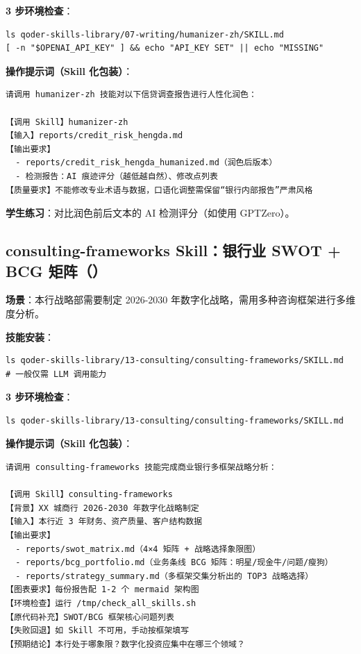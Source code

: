 \textbf{3 步环境检查}：
\begin{lstlisting}[style=shell]
ls qoder-skills-library/07-writing/humanizer-zh/SKILL.md
[ -n "$OPENAI_API_KEY" ] && echo "API_KEY SET" || echo "MISSING"
\end{lstlisting}

\textbf{操作提示词（Skill 化包装）}：

\begin{lstlisting}
请调用 humanizer-zh 技能对以下信贷调查报告进行人性化润色：

【调用 Skill】humanizer-zh
【输入】reports/credit_risk_hengda.md
【输出要求】
  - reports/credit_risk_hengda_humanized.md（润色后版本）
  - 检测报告：AI 痕迹评分（越低越自然）、修改点列表
【质量要求】不能修改专业术语与数据，口语化调整需保留“银行内部报告”严肃风格
\end{lstlisting}

\textbf{学生练习}：对比润色前后文本的 AI 检测评分（如使用 GPTZero）。

\subsection{consulting-frameworks Skill：银行业 SWOT + BCG 矩阵（）}

\textbf{场景}：本行战略部需要制定 2026-2030 年数字化战略，需用多种咨询框架进行多维度分析。

\textbf{技能安装}：

\begin{lstlisting}[style=shell]
ls qoder-skills-library/13-consulting/consulting-frameworks/SKILL.md
# 一般仅需 LLM 调用能力
\end{lstlisting}

\textbf{3 步环境检查}：
\begin{lstlisting}[style=shell]
ls qoder-skills-library/13-consulting/consulting-frameworks/SKILL.md
\end{lstlisting}

\textbf{操作提示词（Skill 化包装）}：

\begin{lstlisting}
请调用 consulting-frameworks 技能完成商业银行多框架战略分析：

【调用 Skill】consulting-frameworks
【背景】XX 城商行 2026-2030 年数字化战略制定
【输入】本行近 3 年财务、资产质量、客户结构数据
【输出要求】
  - reports/swot_matrix.md（4×4 矩阵 + 战略选择象限图）
  - reports/bcg_portfolio.md（业务条线 BCG 矩阵：明星/现金牛/问题/瘦狗）
  - reports/strategy_summary.md（多框架交集分析出的 TOP3 战略选择）
【图表要求】每份报告配 1-2 个 mermaid 架构图
【环境检查】运行 /tmp/check_all_skills.sh
【原代码补充】SWOT/BCG 框架核心问题列表
【失败回退】如 Skill 不可用，手动按框架填写
【预期结论】本行处于哪象限？数字化投资应集中在哪三个领域？
\end{lstlisting}


